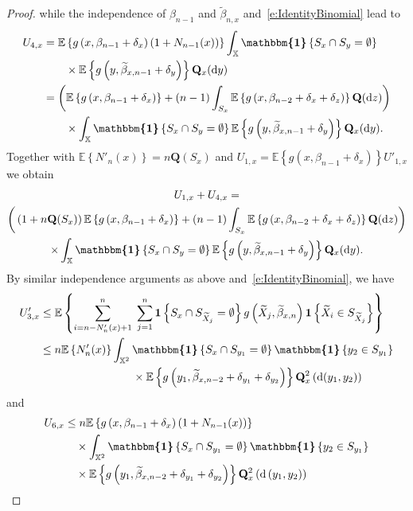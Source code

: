 \documentclass[AHL,Unicode,longabstracts]{cedram}
\newcommand{\bQ}{\mathbf{Q}}
\newcommand*\X{\mathbb{X}}
\newcommand{\E}{\mathbb{E}}
\newcommand{\bfun}{\mathbf{1}}
\newcommand*\md{\mathrm{d}}
\newcommand{\mean}[1] {\E\left\{{#1}\right\}}
\newcommand{\ind}{\boldsymbol{\mathbbm{1}}}
\begin{document}
\begin{proof}
\noindent while the independence of $\beta_{n-1}$ and $\widetilde{\beta}_{n,x}$ and~\eqref{e:IdentityBinomial} lead to
\begin{align*}
U_{4,x} & = \mean{g\left(x,\beta_{n-1}+\delta_x\right) \left(1+N_{n-1}(x)\right)} \int_{\X} \ind\left\{S_x\cap S_y =\emptyset\right\}\\
&\qquad\times \mean{g\left(y,\widetilde{\beta}_{x,n-1}+\delta_y\right)} \bQ_x(\md y) \\
& = \bigg(\mean{g\left(x,\beta_{n-1}+\delta_x\right)} + (n-1) \int_{S_x} \mean{g\left(x,\beta_{n-2}+\delta_x+\delta_z\right)} \bQ(\md z) \bigg) \\
& \quad \quad \times \int_{\X} \ind\left\{S_x\cap S_y=\emptyset\right\} \mean{g\left(y,\widetilde{\beta}_{x,n-1}+\delta_y\right)} \bQ_x(\md y).
\end{align*}
Together with $\mean{N'_n(x)}=n \bQ(S_x)$ and $U_{1,x}=\mean{g(x,\beta_{n-1}+\delta_x)} U'_{1,x}$ we obtain
\begin{multline}\label{e:U1+U4}
U_{1,x} + U_{4,x} = \\
\bigg(\left(1+n \bQ(S_x)\right) \mean{g\left(x,\beta_{n-1}+\delta_x\right)}
+ (n-1) \int_{S_x} \mean{g\left(x,\beta_{n-2}+\delta_x+\delta_z\right)} \bQ(\md z) \bigg) \\
\times \int_{\X} \ind\left\{S_x\cap S_y=\emptyset\right\} \mean{g\left(y,\widetilde{\beta}_{x,n-1}+\delta_y\right)} \bQ_x(\md y).
\end{multline}
By similar independence arguments as above and~\eqref{e:IdentityBinomial}, we have
\begin{align*}
U'_{3,x} & \leq \mean{ \sum_{i=n-N_n'(x)+1}^n \;\sum_{j=1}^{n} \bfun\left\{ S_x \cap S_{\widetilde{X}_j}=\emptyset\right\} g\left(\widetilde{X}_j,\widetilde{\beta}_{x,n}\right) \bfun\left\{\widetilde{X}_i \in S_{\widetilde{X}_j} \right\}} \\
& \leq n \mean{N_n'(x)} \int_{\X^2} \ind\left\{S_x\cap S_{y_1}=\emptyset\right\} \ind\left\{y_2\in S_{y_1}\right\} \\
&\mkern150mu \times\mean{g\left(y_1,\widetilde{\beta}_{x,n-2}+\delta_{y_1}+\delta_{y_2}\right)} \bQ_x^2\left(\md(y_1,y_2)\right)
\end{align*}
and
\begin{align*}
U_{6,x} & \leq n \mean{g\left(x,\beta_{n-1}+\delta_x\right) \left(1+N_{n-1}(x)\right) } \\
& \quad \times \int_{\X^2} \ind\left\{S_x\cap S_{y_1}=\emptyset\right\} \ind\left\{ y_2\in S_{y_1}\right\}\\
&\quad\times\mean{g\left(y_1,\widetilde{\beta}_{x,n-2}+\delta_{y_1}+\delta_{y_2}\right)} \bQ^2_x\left(\md\left(y_1,y_2\right)\right) \\

\end{align*}
\end{proof}
\end{document}
